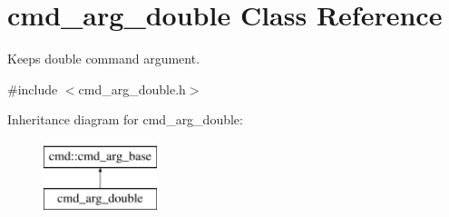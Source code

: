 \hypertarget{classcmd__arg__double}{\section{cmd\-\_\-arg\-\_\-double Class Reference}
\label{classcmd__arg__double}
}


Keeps double command argument.  




{\ttfamily \#include $<$cmd\-\_\-arg\-\_\-double.\-h$>$}

Inheritance diagram for cmd\-\_\-arg\-\_\-double\-:\begin{figure}[H]
\begin{center}
\leavevmode
\includegraphics[height=2.000000cm]{classcmd__arg__double}
\end{center}
\end{figure}
